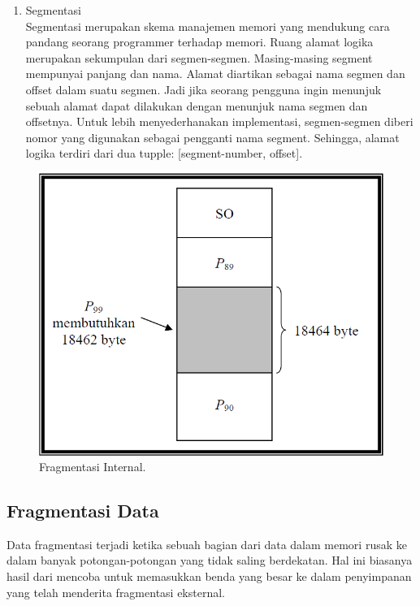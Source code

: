 \begin{enumerate}
\item Segmentasi\\
Segmentasi merupakan skema manajemen memori yang mendukung cara pandang seorang programmer terhadap memori. Ruang alamat logika merupakan sekumpulan dari segmen-segmen. Masing-masing segment mempunyai panjang dan nama. Alamat diartikan sebagai nama segmen dan offset dalam suatu segmen. Jadi jika seorang pengguna ingin menunjuk sebuah alamat dapat dilakukan dengan menunjuk nama segmen dan offsetnya. Untuk lebih menyederhanakan implementasi, segmen-segmen diberi nomor yang digunakan sebagai pengganti nama segment. Sehingga, alamat logika terdiri dari dua tupple: [segment-number, offset].

\end{enumerate}

\begin{figure}[ht]
\centerline{\includegraphics[width=1\textwidth]{figures/fragmentasi_internal.png}}
\caption{Fragmentasi Internal.}
\label{fragmentasiinternal}
\end{figure}

\subsection{Fragmentasi Data}

Data fragmentasi terjadi ketika sebuah bagian dari data dalam memori rusak ke dalam banyak potongan-potongan yang tidak saling berdekatan. Hal ini biasanya hasil dari mencoba untuk memasukkan benda yang besar ke dalam penyimpanan yang telah menderita fragmentasi eksternal.

